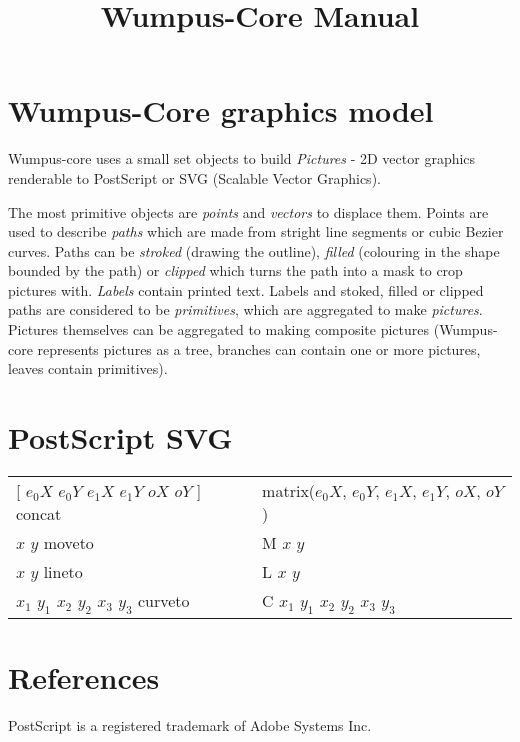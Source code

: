 \documentclass{article}
\begin{document}
\title{Wumpus-Core Manual}
\maketitle





\section{Wumpus-Core graphics model}

Wumpus-core uses a small set objects to build \emph{Pictures} - 
2D vector graphics renderable to PostScript or SVG (Scalable 
Vector Graphics). 

The most primitive objects are \emph{points} and \emph{vectors} 
to displace them. Points are used to describe \emph{paths} which 
are made from stright line segments or cubic Bezier curves. Paths 
can be \emph{stroked} (drawing the outline), \emph{filled} 
(colouring in the shape bounded by the path) or \emph{clipped} 
which turns the path into a mask to crop pictures with. 
\emph{Labels} contain printed text. Labels and stoked, filled 
or clipped paths are considered to be \emph{primitives}, which 
are aggregated to make \emph{pictures}. Pictures themselves can 
be aggregated to making composite pictures (Wumpus-core represents 
pictures as a tree, branches can contain one or more pictures, 
leaves contain primitives).
 


\section{PostScript SVG}

\begin{tabular}{l l}
[ $e_{0}X$ $e_{0}Y$ $e_{1}X$ $e_{1}Y$ $oX$ $oY$ ] concat & 
matrix($e_{0}X$, $e_{0}Y$, $e_{1}X$, $e_{1}Y$, $oX$, $oY$) \\
$x$ $y$ moveto & M $x$ $y$ \\
$x$ $y$ lineto & L $x$ $y$ \\
$x_{1}$ $y_{1}$ $x_{2}$ $y_{2}$ $x_{3}$ $y_{3}$ curveto  & 
C $x_{1}$ $y_{1}$ $x_{2}$ $y_{2}$ $x_{3}$ $y_{3}$ \\
\end{tabular}




\section{References}

PostScript is a registered trademark of Adobe Systems Inc.
\end{document}

